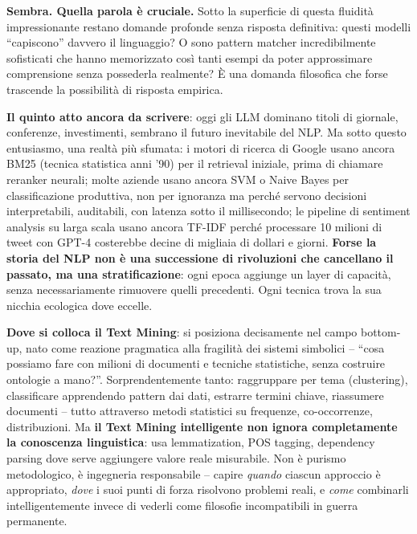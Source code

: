 \documentclass[12pt,a4paper]{article}
\begin{document}
\begin{quizbox}
\textbf{Sembra. Quella parola \`e cruciale.} Sotto la superficie di questa fluidit\`a impressionante restano domande profonde senza risposta definitiva: questi modelli ``capiscono'' davvero il linguaggio? O sono pattern matcher incredibilmente sofisticati che hanno memorizzato cos\`i tanti esempi da poter approssimare comprensione senza possederla realmente? \`E una domanda filosofica che forse trascende la possibilit\`a di risposta empirica.
\end{quizbox}

\textbf{Il quinto atto ancora da scrivere}: oggi gli LLM dominano titoli di giornale, conferenze, investimenti, sembrano il futuro inevitabile del NLP. Ma sotto questo entusiasmo, una realt\`a pi\`u sfumata: i motori di ricerca di Google usano ancora BM25 (tecnica statistica anni '90) per il retrieval iniziale, prima di chiamare reranker neurali; molte aziende usano ancora SVM o Naive Bayes per classificazione produttiva, non per ignoranza ma perch\'e servono decisioni interpretabili, auditabili, con latenza sotto il millisecondo; le pipeline di sentiment analysis su larga scala usano ancora TF-IDF perch\'e processare 10 milioni di tweet con GPT-4 costerebbe decine di migliaia di dollari e giorni. \textbf{Forse la storia del NLP non \`e una successione di rivoluzioni che cancellano il passato, ma una stratificazione}: ogni epoca aggiunge un layer di capacit\`a, senza necessariamente rimuovere quelli precedenti. Ogni tecnica trova la sua nicchia ecologica dove eccelle.

\textbf{Dove si colloca il Text Mining}: si posiziona decisamente nel campo bottom-up, nato come reazione pragmatica alla fragilit\`a dei sistemi simbolici -- ``cosa possiamo fare con milioni di documenti e tecniche statistiche, senza costruire ontologie a mano?''. Sorprendentemente tanto: raggruppare per tema (clustering), classificare apprendendo pattern dai dati, estrarre termini chiave, riassumere documenti -- tutto attraverso metodi statistici su frequenze, co-occorrenze, distribuzioni. Ma \textbf{il Text Mining intelligente non ignora completamente la conoscenza linguistica}: usa lemmatization, POS tagging, dependency parsing dove serve aggiungere valore reale misurabile. Non \`e purismo metodologico, \`e ingegneria responsabile -- capire \emph{quando} ciascun approccio \`e appropriato, \emph{dove} i suoi punti di forza risolvono problemi reali, e \emph{come} combinarli intelligentemente invece di vederli come filosofie incompatibili in guerra permanente.
\end{document}
